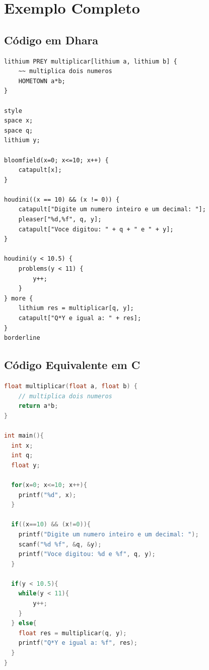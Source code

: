\documentclass[a4paper,12pt]{article}
\begin{document}
\newpage
\section{Exemplo Completo}
\subsection{Código em Dhara}
\begin{lstlisting}[style=DharaStyle]
lithium PREY multiplicar[lithium a, lithium b] {
    ~~ multiplica dois numeros
    HOMETOWN a*b;
}

style
space x;
space q;
lithium y;

bloomfield(x=0; x<=10; x++) {
    catapult[x];
}

houdini((x == 10) && (x != 0)) {
    catapult["Digite um numero inteiro e um decimal: "];
    pleaser["%d,%f", q, y];
    catapult["Voce digitou: " + q + " e " + y];
}

houdini(y < 10.5) {
    problems(y < 11) {
        y++;
    }
} more {
    lithium res = multiplicar[q, y];
    catapult["Q*Y e igual a: " + res];
}
borderline
\end{lstlisting}

\newpage
\subsection{Código Equivalente em C}
\begin{lstlisting}[language=C]
float multiplicar(float a, float b) {
    // multiplica dois numeros
    return a*b;
}

int main(){
  int x;
  int q;
  float y;

  for(x=0; x<=10; x++){
    printf("%d", x);
  }

  if((x==10) && (x!=0)){
    printf("Digite um numero inteiro e um decimal: ");
    scanf("%d %f", &q, &y);
    printf("Voce digitou: %d e %f", q, y);
  }

  if(y < 10.5){
    while(y < 11){
        y++;
    }
  } else{
    float res = multiplicar(q, y);
    printf("Q*Y e igual a: %f", res);
  }
}
\end{lstlisting}
\end{document}
